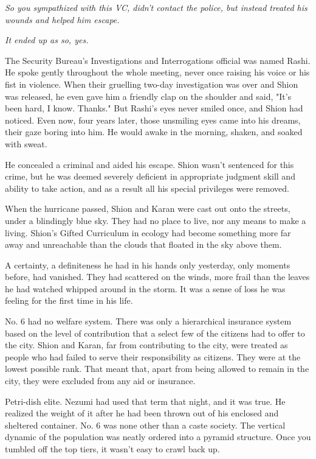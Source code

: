 \emph{So you sympathized with this VC, didn't contact the police, but instead
treated his wounds and helped him escape.}

\emph{It ended up as so, yes.}

The Security Bureau's Investigations and Interrogations official was
named Rashi. He spoke gently throughout the whole meeting, never once
raising his voice or his fist in violence. When their gruelling two-day
investigation was over and Shion was released, he even gave him a
friendly clap on the shoulder and said, "It's been hard, I know.
Thanks." But Rashi's eyes never smiled once, and Shion had noticed. Even
now, four years later, those unsmiling eyes came into his dreams, their
gaze boring into him. He would awake in the morning, shaken, and soaked
with sweat.

He concealed a criminal and aided his escape. Shion wasn't sentenced for
this crime, but he was deemed severely deficient in appropriate judgment
skill and ability to take action, and as a result all his special
privileges were removed.

When the hurricane passed, Shion and Karan were cast out onto the
streets, under a blindingly blue sky. They had no place to live, nor any
means to make a living. Shion's Gifted Curriculum in ecology had become
something more far away and unreachable than the clouds that floated in
the sky above them.

A certainty, a definiteness he had in his hands only yesterday, only
moments before, had vanished. They had scattered on the winds, more
frail than the leaves he had watched whipped around in the storm. It was
a sense of loss he was feeling for the first time in his life.

No. 6 had no welfare system. There was only a hierarchical insurance
system based on the level of contribution that a select few of the
citizens had to offer to the city. Shion and Karan, far from
contributing to the city, were treated as people who had failed to serve
their responsibility as citizens. They were at the lowest possible rank.
That meant that, apart from being allowed to remain in the city, they
were excluded from any aid or insurance.

Petri-dish elite. Nezumi had used that term that night, and it was true.
He realized the weight of it after he had been thrown out of his
enclosed and sheltered container. No. 6 was none other than a caste
society. The vertical dynamic of the population was neatly ordered into
a pyramid structure. Once you tumbled off the top tiers, it wasn't easy
to crawl back up.

